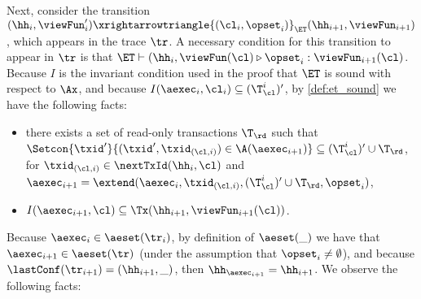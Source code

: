 Next, consider the transition $(\hh_{i}, \viewFun_{i}') \xrightarrowtriangle{(\cl_{i}, \opset_{i})}_{\ET} 
(\hh_{i+1}, \viewFun_{i+1})$, which appears in the trace $\tr$. A necessary condition for this transition 
to appear in $\tr$ is that $\ET \vdash (\hh_{i}, \viewFun(\cl) \triangleright \opset_{i}: \viewFun_{i+1}(\cl)$. 
Because $I$ is the invariant condition used in the proof that $\ET$ is sound with respect to $\Ax$, 
and because 
$I(\aexec_{i}, \cl_{i}) \subseteq (\T^{i}_{\cl})'$, 
by \cref{def:et_sound} we have the following facts: 
\begin{itemize}
\item there exists a set of read-only transactions $\T_\rd$ 
such that $\Setcon{\txid' }{ (\txid', \txid_{(\cl, i)}) \in \A(\aexec_{i+1})} \subseteq 
(\T^{i}_{\cl})' \cup \T_\rd$, for 
$\txid_{(\cl, i)} \in \nextTxId(\hh_{i}, \cl)$ and $\aexec_{i+1} = 
\extend(\aexec_{i}, \txid_{(\cl, i)}, (\T^{i}_{\cl})' \cup \T_\rd, \opset_{i})$, 
\item  $I(\aexec_{i+1}, \cl) \subseteq \Tx(\hh_{i+1}, \viewFun_{i+1}(\cl))$.
\end{itemize} 
Because $\aexec_{i} \in \aeset(\tr_{i})$, by definition of $\aeset(\_)$ we have that 
$\aexec_{i+1} \in \aeset(\tr)$ (under the assumption that $\opset_{i} \neq \emptyset$), 
and because $\lastConf(\tr_{i+1}) = (\hh_{i+1}, \_)$, then $\hh_{\aexec_{i+1}} = \hh_{i+1}$. 
We observe the following facts: 
